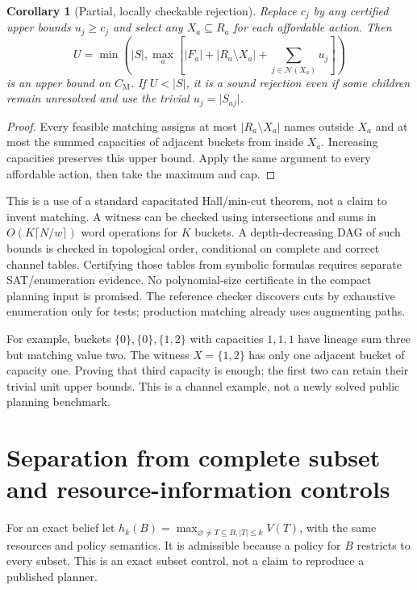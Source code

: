\documentclass[11pt]{article}
\newtheorem{corollary}[theorem]{Corollary}
\theoremstyle{definition}
\newcommand{\card}[1]{\lvert #1\rvert}
\newcommand{\CM}{C_{\mathrm M}}
\newcommand{\N}{\mathcal N}
\begin{document}
\begin{corollary}[Partial, locally checkable rejection]
Replace $c_j$ by any certified upper bounds $u_j\geq c_j$ and select any
$X_a\subseteq R_a$ for each affordable action. Then
\begin{equation}\label{eq:partialcut}
U=\min\left(\card S,\max_a\left[
 \card{F_a}+\card{R_a\setminus X_a}+
 \sum_{j\in\N(X_a)}u_j\right]\right)
\end{equation}
is an upper bound on $\CM$. If $U<\card S$, it is a sound rejection even if
some children remain unresolved and use the trivial $u_j=\card{S_{aj}}$.
\end{corollary}
\begin{proof}
Every feasible matching assigns at most $\card{R_a\setminus X_a}$ names
outside $X_a$ and at most the summed capacities of adjacent buckets from
inside $X_a$. Increasing capacities preserves this upper bound. Apply the
same argument to every affordable action, then take the maximum and cap.
\end{proof}
This is a use of a standard capacitated Hall/min-cut theorem, not a claim to
invent matching. A witness can be checked using intersections and sums in
$O(K\lceil N/w\rceil)$ word operations for $K$ buckets. A depth-decreasing DAG
of such bounds is checked in topological order, conditional on complete and
correct channel tables. Certifying those tables from symbolic formulas requires
separate SAT/enumeration evidence. No polynomial-size certificate in the compact
planning input is promised. The reference checker discovers cuts by exhaustive
enumeration only for tests; production matching already uses augmenting paths.

For example, buckets $\{0\},\{0\},\{1,2\}$ with capacities $1,1,1$ have
lineage sum three but matching value two. The witness $X=\{1,2\}$ has only
one adjacent bucket of capacity one. Proving that third capacity is enough;
the first two can retain their trivial unit upper bounds. This is a channel
example, not a newly solved public planning benchmark.

\section{Separation from complete subset and resource-information controls}
For an exact belief let $h_k(B)=\max_{\varnothing\neq T\subseteq B,\card T\leq k}
V(T)$, with the same resources and policy semantics. It is admissible because
a policy for $B$ restricts to every subset. This is an exact subset control,
not a claim to reproduce a published planner.
\end{document}
